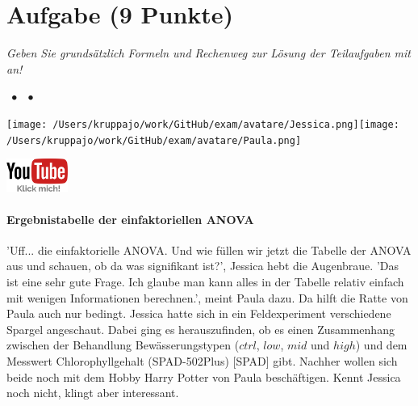 \documentclass[a4paper, 9pt]{scrartcl}\usepackage[]{graphicx}\usepackage[]{xcolor}
\begin{document}
\clearpage

\section{Aufgabe \hfill (9 Punkte)}

\textit{Geben Sie grundsätzlich Formeln und Rechenweg zur Lösung der Teilaufgaben mit an!} \\[1Ex]
 

 
\ifcollection
\begin{flushright}
\tiny\vspace{-3Ex}
\textbf{\examinhaltstart}
\exammodulemathstat $\;\bullet$
\exammodulestat $\;\bullet$
\exammodulestatbbv 
\vspace{-4Ex}
\end{flushright}
\begin{minipage}[t]{0.5\textwidth}
\texttt{[image: /Users/kruppajo/work/GitHub/exam/avatare/Jessica.png]}\hspace{-4mm}\texttt{[image: /Users/kruppajo/work/GitHub/exam/avatare/Paula.png]}
\end{minipage}
\begin{minipage}[t]{0.5\textwidth}
\hfill
\href{https://youtu.be/IhecxMcCENY}{\includegraphics[width = 2cm]{img/youtube}}
\end{minipage}
\fi



\ifcollection
\paragraph{Ergebnistabelle der einfaktoriellen ANOVA}
\fi

'Uff... die einfaktorielle ANOVA. Und wie füllen wir jetzt die Tabelle der ANOVA aus und schauen, ob da was signifikant ist?', Jessica hebt die Augenbraue. 'Das ist eine sehr gute Frage. Ich glaube man kann alles in der Tabelle relativ einfach mit wenigen Informationen berechnen.', meint Paula dazu. Da hilft die Ratte von Paula auch nur bedingt. Jessica hatte sich in ein Feldexperiment verschiedene Spargel angeschaut. Dabei ging es herauszufinden, ob es einen Zusammenhang zwischen der Behandlung Bewässerungstypen ($ctrl$, $low$, $mid$ und $high$) und dem Messwert Chlorophyllgehalt (SPAD-502Plus) [SPAD] gibt. Nachher wollen sich beide noch mit dem Hobby Harry Potter von Paula beschäftigen. Kennt Jessica noch nicht, klingt aber interessant.
\end{document}
